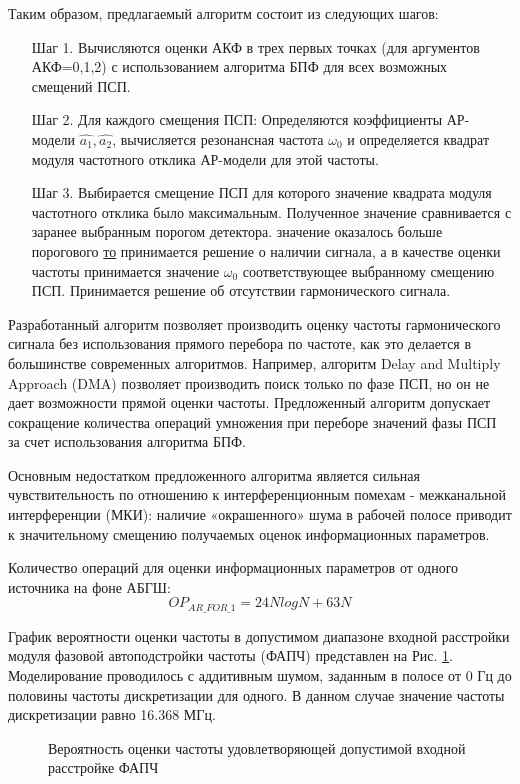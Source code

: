 Таким образом, предлагаемый алгоритм состоит из следующих шагов:

\begin{itemize}
\item[Шаг 1.] Вычисляются оценки  АКФ в трех первых точках (для аргументов АКФ=0,1,2)
	с использованием алгоритма БПФ для всех возможных смещений ПСП. 
\item[Шаг 2.] Для каждого смещения ПСП: 
	Определяются коэффициенты АР-модели ${\hat{a_1}, \hat{a_2}}$,
	вычисляется резонансная частота ${\omega_0}$
	и определяется квадрат модуля частотного отклика АР-модели для этой частоты. 
\item[Шаг 3.] Выбирается смещение ПСП для которого значение квадрата модуля частотного отклика было максимальным. Полученное значение сравнивается с заранее выбранным порогом детектора. 
	  значение оказалось больше порогового {\underline{то}} 
		принимается решение о наличии сигнала, а в качестве оценки
		частоты принимается значение ${\omega_0}$ соответствующее выбранному смещению ПСП. 
		Принимается решение об отсутствии гармонического сигнала.
\end{itemize}

Разработанный алгоритм позволяет производить оценку частоты гармонического сигнала без использования прямого перебора по частоте, как это делается в большинстве современных алгоритмов.
Например, алгоритм Delay and Multiply Approach (DMA) позволяет производить поиск только по фазе ПСП, но он не дает возможности прямой оценки частоты. 
Предложенный алгоритм допускает сокращение количества операций умножения при переборе значений фазы ПСП за счет использования алгоритма БПФ.

Основным недостатком предложенного алгоритма является сильная чувствительность по отношению к интерференционным помехам - межканальной интерференции (МКИ):
наличие «окрашенного» шума в рабочей полосе приводит к значительному смещению получаемых оценок информационных параметров.

Количество операций для оценки информационных параметров от одного источника на фоне АБГШ:
\begin{equation}
	OP_{AR\_FOR\_1} = 24NlogN + 63N
\end{equation}

График вероятности оценки частоты в допустимом диапазоне входной расстройки модуля фазовой автоподстройки частоты (ФАПЧ) представлен на Рис.
\ref{pic:lpc_for_1_probability}. Моделирование проводилось с аддитивным шумом, заданным в полосе от 0 Гц до
половины частоты дискретизации для одного. В данном случае значение частоты дискретизации равно 16.368 МГц.
\begin{figure}[H]
\center{}
	\caption{Вероятность оценки частоты удовлетворяющей допустимой входной расстройке ФАПЧ}
	\label{pic:lpc_for_1_probability}
\end{figure}

